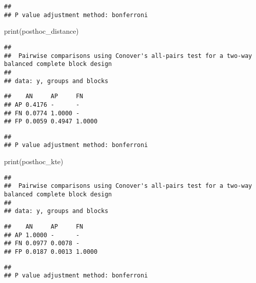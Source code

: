 \documentclass[
]{article}
\newenvironment{Shaded}{\begin{snugshade}}{\end{snugshade}}
\newcommand{\FunctionTok}[1]{\textcolor[rgb]{0.00,0.00,0.00}{#1}}
\newcommand{\NormalTok}[1]{#1}
\begin{document}
\begin{verbatim}
## 
## P value adjustment method: bonferroni
\end{verbatim}

\begin{Shaded}
\begin{Highlighting}[]
\FunctionTok{print}\NormalTok{(posthoc\_distance)}
\end{Highlighting}
\end{Shaded}

\begin{verbatim}
## 
##  Pairwise comparisons using Conover's all-pairs test for a two-way balanced complete block design
## 
## data: y, groups and blocks
\end{verbatim}

\begin{verbatim}
##    AN     AP     FN    
## AP 0.4176 -      -     
## FN 0.0774 1.0000 -     
## FP 0.0059 0.4947 1.0000
\end{verbatim}

\begin{verbatim}
## 
## P value adjustment method: bonferroni
\end{verbatim}

\begin{Shaded}
\begin{Highlighting}[]
\FunctionTok{print}\NormalTok{(posthoc\_kte)}
\end{Highlighting}
\end{Shaded}

\begin{verbatim}
## 
##  Pairwise comparisons using Conover's all-pairs test for a two-way balanced complete block design
## 
## data: y, groups and blocks
\end{verbatim}

\begin{verbatim}
##    AN     AP     FN    
## AP 1.0000 -      -     
## FN 0.0977 0.0078 -     
## FP 0.0187 0.0013 1.0000
\end{verbatim}

\begin{verbatim}
## 
## P value adjustment method: bonferroni
\end{verbatim}
\end{document}
